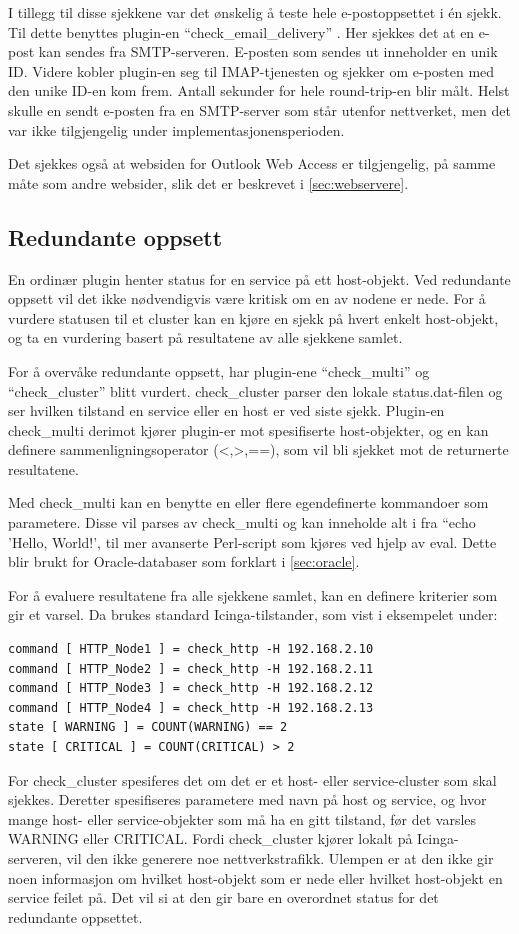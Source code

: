 I tillegg til disse sjekkene var det ønskelig å teste hele e-postoppsettet i én sjekk. Til dette benyttes plugin-en ``check\_email\_delivery'' \cite{exchange}. Her sjekkes det at en e-post kan sendes fra SMTP-serveren. E-posten som sendes ut inneholder en unik ID. Videre kobler plugin-en seg til IMAP-tjenesten og sjekker om e-posten med den unike ID-en kom frem. Antall sekunder for hele round-trip-en blir målt. Helst skulle en sendt e-posten fra en SMTP-server som står utenfor nettverket, men det var ikke tilgjengelig under implementasjonensperioden.

Det sjekkes også at websiden for Outlook Web Access er tilgjengelig, på samme måte som andre websider, slik det er beskrevet i \ref{sec:webservere}.

\subsection{Redundante oppsett}
En ordinær plugin henter status for en service på ett host-objekt. Ved redundante oppsett vil det ikke nødvendigvis være kritisk om en av nodene er nede. For å vurdere statusen til et cluster kan en kjøre en sjekk på hvert enkelt host-objekt, og ta en vurdering basert på resultatene av alle sjekkene samlet.

For å overvåke redundante oppsett, har plugin-ene ``check\_multi'' \cite{checkmulti} og ``check\_cluster'' \cite{checkcluster} blitt vurdert. check\_cluster parser den lokale status.dat-filen og ser hvilken tilstand en service eller en host er ved siste sjekk. Plugin-en check\_multi derimot kjører plugin-er mot spesifiserte host-objekter, og en kan definere sammenligningsoperator (<,>,==), som vil bli sjekket mot de returnerte resultatene.

Med check\_multi kan en benytte en eller flere egendefinerte kommandoer som parametere. Disse vil parses av check\_multi og kan inneholde alt i fra ``echo 'Hello, World!', til mer avanserte Perl-script som kjøres ved hjelp av eval. Dette blir brukt for Oracle-databaser som forklart i \ref{sec:oracle}. 

\clearpage
For å evaluere resultatene fra alle sjekkene samlet, kan en definere kriterier som gir et varsel. Da brukes standard Icinga-tilstander, som vist i eksempelet under:
\begin{lstlisting}[style=example]
command [ HTTP_Node1 ] = check_http -H 192.168.2.10
command [ HTTP_Node2 ] = check_http -H 192.168.2.11
command [ HTTP_Node3 ] = check_http -H 192.168.2.12
command [ HTTP_Node4 ] = check_http -H 192.168.2.13
state [ WARNING ] = COUNT(WARNING) == 2
state [ CRITICAL ] = COUNT(CRITICAL) > 2
\end{lstlisting}
For check\_cluster spesiferes det om det er et host- eller service-cluster som skal sjekkes. Deretter spesifiseres parametere med navn på host og service, og hvor mange host- eller service-objekter som må ha en gitt tilstand, før det varsles WARNING eller CRITICAL. Fordi check\_cluster kjører lokalt på Icinga-serveren, vil den ikke generere noe nettverkstrafikk. Ulempen er at den ikke gir noen informasjon om hvilket host-objekt som er nede eller hvilket host-objekt en service feilet på. Det vil si at den gir bare en overordnet status for det redundante oppsettet. 

